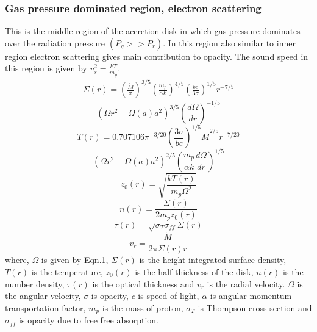 \documentclass[useAMS,usenatbib]{mn2e}
\begin{document}
\subsubsection{Gas pressure dominated region, electron scattering}
This is the middle region of the accretion disk in which gas pressure dominates over the radiation pressure $(P_g >> P_r)$. In this region also similar to inner region electron scattering gives main contribution to opacity. The sound speed in this region is given by $v^2_s = \frac{kT}{m_p}$. 
\begin{eqnarray}
\Sigma(r) = \left(\frac{\dot{M}}{\pi}\right)^{3/5}\left(\frac{m_p}{\alpha k}\right)^{4/5}\left(\frac{bc}{3\sigma}\right)^{1/5}r^{-7/5} 
\end{eqnarray}
$$ \left(\Omega r^2 -\Omega(a) a^2\right)^{3/5}\left(\frac{d\Omega}{dr}\right)^{-1/5}$$
\begin{equation}
T(r) = 0.707106 \pi^{-3/20}\left(\frac{3\sigma}{bc}\right)^{1/5}\dot{M}^{2/5}r^{-7/20}
\end{equation}
$$ \left(\Omega r^2 - \Omega(a)a^2\right)^{2/5}\left(\frac{m_p}{\alpha k}\frac{d\Omega}{dr}\right)^{1/5}$$
\begin{equation}
z_0(r) = \sqrt{\frac{k T(r)}{m_p\Omega^2}}
\end{equation}
\begin{equation}
n(r) = \frac{\Sigma(r)}{2m_p z_0(r)}
\end{equation}
\begin{equation}
\tau(r) = \sqrt{\sigma_T \sigma_{ff}}\Sigma(r)
\end{equation}
\begin{equation}
v_r = \frac{\dot{M}}{2\pi\Sigma(r) r}
\end{equation}
where, $\Omega$ is given by Eqn.1, $\Sigma(r)$ is the height integrated surface density, $T(r)$ is the temperature, $z_0(r)$ is the half thickness of the disk, $n(r)$ is the number density, $\tau(r)$ is the optical thickness and $v_r$ is the radial velocity. $\Omega$ is the angular velocity, $\sigma$ is opacity, $c$ is speed of light, $\alpha$ is angular momentum transportation factor, $m_p$ is the mass of proton, $\sigma_T$ is Thompson cross-section and $\sigma_{ff}$ is opacity due to free free absorption.
\end{document}

